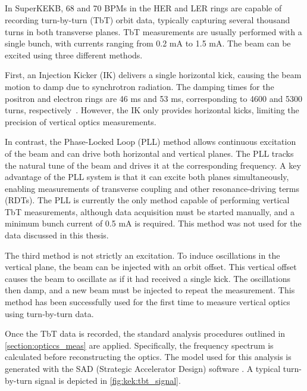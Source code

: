 \FloatBarrier
\subsection{}

In SuperKEKB, 68 and 70 BPMs in the HER and LER rings are capable of recording turn-by-turn (TbT)
orbit data, typically capturing several thousand turns in both transverse planes. TbT measurements
are usually performed with a single bunch, with currents ranging from 0.2 mA to 1.5 mA. The beam can
be excited using three different methods.

First, an Injection Kicker (IK) delivers a single horizontal kick, causing the beam motion to damp
due to synchrotron radiation. The damping times for the positron and electron rings are 46 ms and 53
ms, corresponding to 4600 and 5300 turns, respectively~\cite{keintzel_jacqueline_beam_2022}.
However, the IK only provides horizontal kicks, limiting the precision of vertical optics
measurements.

In contrast, the Phase-Locked Loop (PLL) method allows continuous excitation of the beam and can
drive both horizontal and vertical planes. The PLL tracks the natural tune of the beam and drives it
at the corresponding frequency. A key advantage of the PLL system is that it can excite both planes
simultaneously, enabling measurements of transverse coupling and other resonance-driving terms
(RDTs). The PLL is currently the only method capable of performing vertical TbT measurements,
although data acquisition must be started manually, and a minimum bunch current of 0.5 mA is
required. This method was not used for the data discussed in this thesis.

The third method is not strictly an excitation. To induce oscillations in the vertical plane, the 
beam can be injected with an orbit offset. This vertical offset causes the beam to oscillate as if 
it had received a single kick. The oscillations then damp, and a new beam must be injected to repeat 
the measurement. This method has been successfully used for the first time to measure vertical
optics using turn-by-turn data.

Once the TbT data is recorded, the standard analysis procedures outlined in
\cref{section:opticcs_meas} are applied. Specifically, the frequency spectrum is calculated before
reconstructing the optics. The model used for this analysis is generated with the SAD (Strategic
Accelerator Design) software \cite{noauthor_sad_nodate}.
A typical turn-by-turn signal is depicted in \cref{fig:kek:tbt_signal}.



